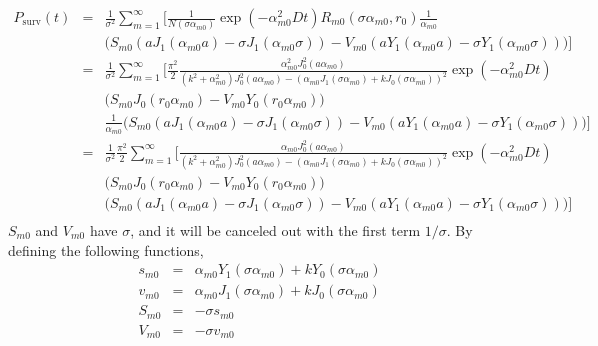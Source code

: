 \documentclass{article}
\begin{document}
\begin{eqnarray}
        P_{\mathrm{surv}}(t)
    &=& \frac{1}{\sigma^2} \sum_{m=1}^{\infty} \Bigg[
        \frac{1}{N(\sigma\alpha_{m0})} \exp(-\alpha_{m0}^2Dt)
        R_{m0}(\sigma\alpha_{m0}, r_0)
        \frac{1}{\alpha_{m0}}
        \nonumber\\
    & & \Big(
        S_{m0} \left(aJ_1(\alpha_{m0}a) - \sigma J_1(\alpha_{m0}\sigma)\right) -
        V_{m0} \left(aY_1(\alpha_{m0}a) - \sigma Y_1(\alpha_{m0}\sigma)\right)
        \Big)
        \Bigg] \nonumber\\
    &=& \frac{1}{\sigma^2} \sum_{m=1}^{\infty}
    \Bigg[
        \frac{\pi^2}{2}
        \frac{\alpha_{m0}^2 J^2_0(a\alpha_{m0})}
             {(k^2 + \alpha_{m0}^2) J_0^2(a\alpha_{m0}) -
              (\alpha_{m0}J_1(\sigma\alpha_{m0}) + kJ_0(\sigma\alpha_{m0}))^2}
        \exp(-\alpha_{m0}^2Dt)
        \nonumber\\
    & & \Big(S_{m0}J_0(r_0\alpha_{m0}) - V_{m0}Y_0(r_0\alpha_{m0})\Big)
        \nonumber\\
    & & \frac{1}{\alpha_{m0}}\Big(
        S_{m0} \left(aJ_1(\alpha_{m0}a) - \sigma J_1(\alpha_{m0}\sigma)\right) -
        V_{m0} \left(aY_1(\alpha_{m0}a) - \sigma Y_1(\alpha_{m0}\sigma)\right)
        \Big)
    \Bigg] \nonumber\\
    &=& \frac{1}{\sigma^2}\frac{\pi^2}{2} \sum_{m=1}^{\infty}
    \Bigg[
        \frac{\alpha_{m0} J^2_0(a\alpha_{m0})}
             {(k^2 + \alpha_{m0}^2) J_0^2(a\alpha_{m0}) -
              (\alpha_{m0}J_1(\sigma\alpha_{m0}) + kJ_0(\sigma\alpha_{m0}))^2}
        \exp(-\alpha_{m0}^2Dt)
        \nonumber\\
    & & \Big(S_{m0}J_0(r_0\alpha_{m0}) - V_{m0}Y_0(r_0\alpha_{m0})\Big)
        \nonumber\\
    & & \Big(
        S_{m0} \left(aJ_1(\alpha_{m0}a) - \sigma J_1(\alpha_{m0}\sigma)\right) -
        V_{m0} \left(aY_1(\alpha_{m0}a) - \sigma Y_1(\alpha_{m0}\sigma)\right)
        \Big)
    \Bigg] \nonumber\\
\end{eqnarray}
%
$S_{m0}$ and $V_{m0}$ have $\sigma$, and it will be canceled out with the first term $1/\sigma$.
By defining the following functions,
%
\begin{eqnarray}
    s_{m0} &=& \alpha_{m0}Y_1(\sigma\alpha_{m0}) + kY_0(\sigma\alpha_{m0}) \\
    v_{m0} &=& \alpha_{m0}J_1(\sigma\alpha_{m0}) + kJ_0(\sigma\alpha_{m0}) \\
    S_{m0} &=& -\sigma s_{m0} \nonumber\\
    V_{m0} &=& -\sigma v_{m0} \nonumber
\end{eqnarray}
\end{document}
